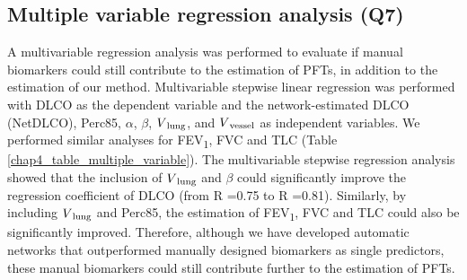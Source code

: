 \subsection{Multiple variable regression analysis (Q7)}
A multivariable regression analysis was performed to evaluate if manual biomarkers could still contribute to the estimation of PFTs, in addition to the estimation of our method. Multivariable stepwise linear regression was performed with DLCO as the dependent variable and the network-estimated DLCO (NetDLCO), Perc85, $\alpha$, $\beta$, $V\textsubscript{lung}$, and $V\textsubscript{vessel}$ as independent variables. We performed similar analyses for FEV\textsubscript{1}, FVC and TLC (Table \ref{chap4_table_multiple_variable}). The multivariable stepwise regression analysis showed that the inclusion of $V\textsubscript{lung}$ and $\beta$ could significantly improve the regression coefficient of DLCO (from R =0.75 to R =0.81). Similarly, by including $V\textsubscript{lung}$ and Perc85, the estimation of FEV\textsubscript{1}, FVC and TLC could also be significantly improved. Therefore, although we have developed automatic networks that outperformed manually designed biomarkers as single predictors, these manual biomarkers could still contribute further to the estimation of PFTs.

